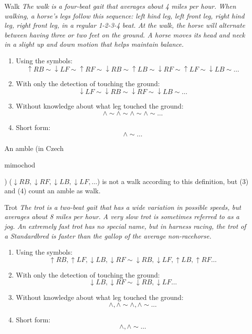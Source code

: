 \begin{definition}{Walk}
	\label{def:walk}
	\textit{The walk is a four-beat gait that averages about 4 miles per hour. When walking, a horse's legs follow this sequence: left hind leg, left front leg, right hind leg, right front leg, in a regular 1-2-3-4 beat. At the walk, the horse will alternate between having three or two feet on the ground. A horse moves its head and neck in a slight up and down motion that helps maintain balance.} \cite{Harrisc1993}
	
	\begin{enumerate}
		\item Using the symbols:
		$$ \uparrow RB \sim \downarrow LF \sim \uparrow RF \sim \downarrow RB \sim \uparrow LB \sim \downarrow RF \sim \uparrow LF \sim \downarrow LB \sim \dots $$
		\item With only the detection of touching the ground:
		$$ \downarrow LF \sim \downarrow RB \sim \downarrow RF \sim \downarrow LB \sim \dots $$
		\item Without knowledge about what leg touched the ground:
		$$ \wedge \sim \wedge \sim \wedge \sim \wedge \sim \dots $$
		\item Short form:
		$$ \wedge \sim \dots $$
	\end{enumerate}
\end{definition}

\begin{remark}
	An amble (in Czech \begin{otherlanguage}{czech}mimochod\end{otherlanguage}) ($\downarrow RB, \downarrow RF, \downarrow LB, \downarrow LF, \dots$) is not a walk according to this definition, but (3) and (4) count an amble as walk.
\end{remark}

\begin{definition}{Trot}
	\label{def:trot}
	\textit{The trot is a two-beat gait that has a wide variation in possible speeds, but averages about 8 miles per hour. A very slow trot is sometimes referred to as a jog. An extremely fast trot has no special name, but in harness racing, the trot of a Standardbred is faster than the gallop of the average non-racehorse.} \cite{Harrisc1993}
	
	\begin{enumerate}
		\item Using the symbols:
		$$ \uparrow RB, \uparrow LF, \downarrow LB, \downarrow RF \sim \downarrow RB, \downarrow LF, \uparrow LB, \uparrow RF \dots $$
		\item With only the detection of touching the ground:
		$$ \downarrow LB, \downarrow RF \sim \downarrow RB, \downarrow LF \dots $$
		\item Without knowledge about what leg touched the ground:
		$$ \wedge, \wedge \sim \wedge, \wedge \sim \dots $$
		\item Short form:
		$$ \wedge, \wedge \sim \dots $$
	\end{enumerate}
\end{definition}

